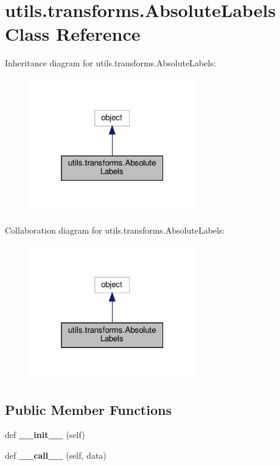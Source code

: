 \hypertarget{classutils_1_1transforms_1_1AbsoluteLabels}{}\section{utils.\+transforms.\+Absolute\+Labels Class Reference}
\label{classutils_1_1transforms_1_1AbsoluteLabels}


Inheritance diagram for utils.\+transforms.\+Absolute\+Labels\+:
\nopagebreak
\begin{figure}[H]
\begin{center}
\leavevmode
\includegraphics[width=205pt]{classutils_1_1transforms_1_1AbsoluteLabels__inherit__graph}
\end{center}
\end{figure}


Collaboration diagram for utils.\+transforms.\+Absolute\+Labels\+:
\nopagebreak
\begin{figure}[H]
\begin{center}
\leavevmode
\includegraphics[width=205pt]{classutils_1_1transforms_1_1AbsoluteLabels__coll__graph}
\end{center}
\end{figure}
\subsection*{Public Member Functions}
\begin{DoxyCompactItemize}
\item 
\mbox{\label{classutils_1_1transforms_1_1AbsoluteLabels_ac5bfffda1c3f3c8626fd83ba8fd4acb4}} 
def {\bfseries \+\_\+\+\_\+init\+\_\+\+\_\+} (self)
\item 
\mbox{\label{classutils_1_1transforms_1_1AbsoluteLabels_aeb4efe3914e346b8116d167188ed3f17}} 
def {\bfseries \+\_\+\+\_\+call\+\_\+\+\_\+} (self, data)
\end{DoxyCompactItemize}


